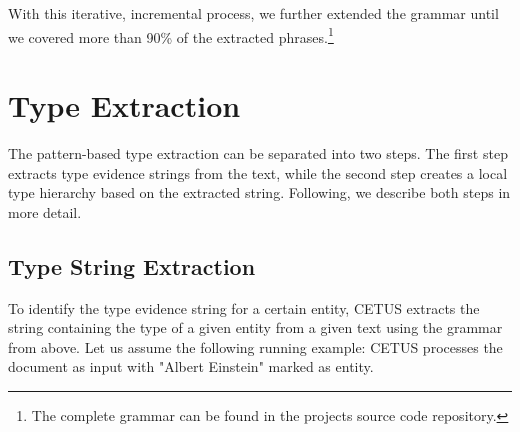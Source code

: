With this iterative, incremental process, we further extended the grammar until we covered more than 90\% of the extracted phrases.\footnote{The complete grammar can be found in the projects source code repository.}



%
%
%
%

\section{Type Extraction}
\label{sec:docAnalysis}

The pattern-based type extraction can be separated into two steps.
The first step extracts type evidence strings from the text, while the second step creates a local type hierarchy based on the extracted string.
Following, we describe both steps in more detail.

\subsection{Type String Extraction}

To identify the type evidence string for a certain entity, CETUS extracts the string containing the type of a given entity from a given text using the grammar from above.
Let us assume the following running example: CETUS processes the document as input with "Albert Einstein" marked as entity.

